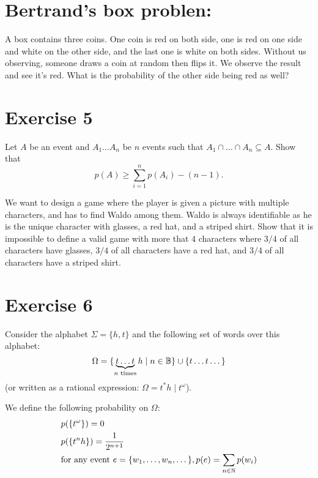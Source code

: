 \documentclass{article}
\begin{document}
\section*{Bertrand's box problen:}
A box contains three coins. One coin is red on both side, one is red on one side and white on the other side, and the last one is white on both sides. Without us observing, someone draws a coin at random then flips it. We observe the result and see it's red. What is the probability of the other side being red as well?


\section*{Exercise 5}
Let $A$ be an event and $A_1 \dots A_n$ be $n$ events such that $A_1 \cap \dots \cap A_n \subseteq A$. Show that
\[p(A) \ge \sum^n_{i=1} p(A_i) - (n-1).\]

We want to design a game where the player is given a picture with multiple characters, and has to find Waldo among them. Waldo is always identifiable as he is the unique character with glasses, a red hat, and a striped shirt. Show that it is impossible to define a valid game with more that $4$ characters where $3/4$ of all characters have glasses, $3/4$ of all characters have a red hat, and $3/4$ of all characters have a striped shirt.

\section*{Exercise 6}
Consider the alphabet $\Sigma = \{h, t\}$ and the following set of words over this alphabet:
\[ \Omega = \{ \underbrace{t\dots t}_{n \textnormal{ times}}h \mid n \in \mathbb{B} \} \cup \{ t \dots t \dots \} \]
(or written as a rational expression: $\Omega = t^*h \mid t^{\omega}$).

We define the following probability on $\Omega$:
\[ \begin{aligned}
  &p(\{t^{\omega}\}) = 0\\
  &p(\{t^n h\}) =  \frac{1}{2^{n+1}} \\
  &\textnormal{for any event } e = \{w_1, \dots, w_n, \dots \}, p(e) = \sum_{n \in \mathbb{N}} p(w_i)
\end{aligned} \]
\end{document}
